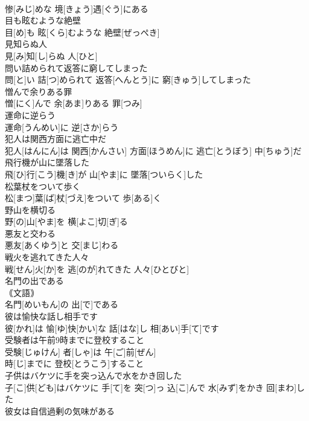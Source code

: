 \documentclass[8pt]{extreport}
\begin{document}
\begin{CJK}{UTF8}{min}
\\	惨[みじ]めな 境[きょう]遇[ぐう]にある
\\	目も眩むような絶壁	
\\	目[め]も 眩[くら]むような 絶壁[ぜっぺき]
\\	見知らぬ人	
\\	見[み]知[し]らぬ 人[ひと]
\\	問い詰められて返答に窮してしまった	
\\	問[と]い 詰[つ]められて 返答[へんとう]に 窮[きゅう]してしまった
\\	憎んで余りある罪	
\\	憎[にく]んで 余[あま]りある 罪[つみ]
\\	運命に逆らう	
\\	運命[うんめい]に 逆[さか]らう
\\	犯人は関西方面に逃亡中だ	
\\	犯人[はんにん]は 関西[かんさい] 方面[ほうめん]に 逃亡[とうぼう] 中[ちゅう]だ
\\	飛行機が山に墜落した	
\\	飛[ひ]行[こう]機[き]が 山[やま]に 墜落[ついらく]した
\\	松葉杖をついて歩く	
\\	松[まつ]葉[ば]杖[づえ]をついて 歩[ある]く
\\	野山を横切る	
\\	野[の]山[やま]を 横[よこ]切[ぎ]る
\\	悪友と交わる	
\\	悪友[あくゆう]と 交[まじ]わる
\\	戦火を逃れてきた人々	
\\	戦[せん]火[か]を 逃[のが]れてきた 人々[ひとびと]
\\	名門の出である	
\\	｟文語｠ 
\\	名門[めいもん]の 出[で]である
\\	彼は愉快な話し相手です	
\\	彼[かれ]は 愉[ゆ]快[かい]な 話[はな]し 相[あい]手[て]です
\\	受験者は午前9時までに登校すること	
\\	受験[じゅけん] 者[しゃ]は 午[ご]前[ぜん] 
\\	時[じ]までに 登校[とうこう]すること
\\	子供はバケツに手を突っ込んで水をかき回した	
\\	子[こ]供[ども]はバケツに 手[て]を 突[つ]っ 込[こ]んで 水[みず]をかき 回[まわ]した
\\	彼女は自信過剰の気味がある	

\end{CJK}
\end{document}
